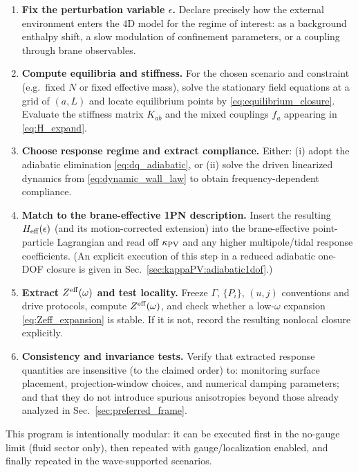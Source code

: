 \documentclass[11pt]{article}
\begin{document}
\begin{enumerate}
  \item \textbf{Fix the perturbation variable $\epsilon$.}
  Declare precisely how the external environment enters the 4D model for the regime of interest:
  as a background enthalpy shift, a slow modulation of confinement parameters, or a coupling through brane observables.

  \item \textbf{Compute equilibria and stiffness.}
  For the chosen scenario and constraint (e.g.\ fixed $N$ or fixed effective mass),
  solve the stationary field equations at a grid of $(a,L)$ and locate equilibrium points by \eqref{eq:equilibrium_closure}.
  Evaluate the stiffness matrix $K_{ab}$ and the mixed couplings $f_a$ appearing in \eqref{eq:H_expand}.

  \item \textbf{Choose response regime and extract compliance.}
  Either:
  (i) adopt the adiabatic elimination \eqref{eq:dq_adiabatic}, or
  (ii) solve the driven linearized dynamics from \eqref{eq:dynamic_wall_law} to obtain frequency-dependent compliance.

  \item \textbf{Match to the brane-effective 1PN description.}
  Insert the resulting $H_{\rm eff}(\epsilon)$ (and its motion-corrected extension) into the brane-effective point-particle Lagrangian
  and read off $\kappa_{\rm PV}$ and any higher multipole/tidal response coefficients.
  (An explicit execution of this step in a reduced adiabatic one-DOF closure is given in Sec.~\ref{sec:kappaPV:adiabatic1dof}.)

  \item \textbf{Extract $Z^{\rm eff}(\omega)$ and test locality.}
  Freeze $\Gamma$, $\{P_i\}$, $(u,j)$ conventions and drive protocols, compute $Z^{\rm eff}(\omega)$, and check whether
  a low-$\omega$ expansion \eqref{eq:Zeff_expansion} is stable. If it is not, record the resulting nonlocal closure explicitly.

  \item \textbf{Consistency and invariance tests.}
  Verify that extracted response quantities are insensitive (to the claimed order) to:
  monitoring surface placement, projection-window choices, and numerical damping parameters; and that they do not introduce
  spurious anisotropies beyond those already analyzed in Sec.~\ref{sec:preferred_frame}.
\end{enumerate}

This program is intentionally modular: it can be executed first in the no-gauge limit (fluid sector only),
then repeated with gauge/localization enabled, and finally repeated in the wave-supported scenarios.
\end{document}
